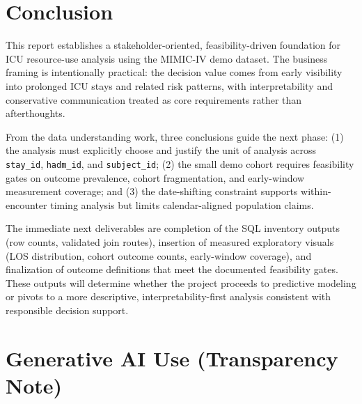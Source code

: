 \documentclass[12pt]{article}
\begin{document}
\section*{Conclusion}
\label{sec:conclusion}

%
%

This report establishes a stakeholder-oriented, feasibility-driven foundation for ICU resource-use analysis using the MIMIC-IV demo dataset. The business framing is intentionally practical: the decision value comes from early visibility into prolonged ICU stays and related risk patterns, with interpretability and conservative communication treated as core requirements rather than afterthoughts.

From the data understanding work, three conclusions guide the next phase: (1) the analysis must explicitly choose and justify the unit of analysis across \texttt{stay\_id}, \texttt{hadm\_id}, and \texttt{subject\_id}; (2) the small demo cohort requires feasibility gates on outcome prevalence, cohort fragmentation, and early-window measurement coverage; and (3) the date-shifting constraint supports within-encounter timing analysis but limits calendar-aligned population claims.

The immediate next deliverables are completion of the SQL inventory outputs (row counts, validated join routes), insertion of measured exploratory visuals (LOS distribution, cohort outcome counts, early-window coverage), and finalization of outcome definitions that meet the documented feasibility gates. These outputs will determine whether the project proceeds to predictive modeling or pivots to a more descriptive, interpretability-first analysis consistent with responsible decision support.

\newpage
\section*{Generative AI Use (Transparency Note)}
\end{document}
